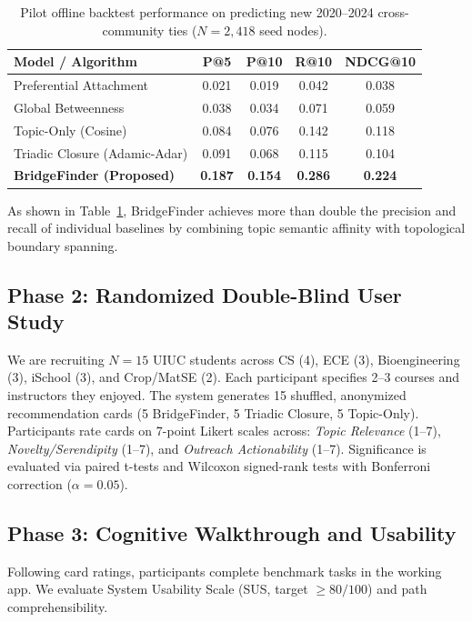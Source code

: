 \begin{table}[h]
\centering
\small
\caption{Pilot offline backtest performance on predicting new 2020--2024 cross-community ties ($N = 2,418$ seed nodes).}
\label{tab:backtest_pilot}
\begin{tabularx}{\columnwidth}{lcccc}
\toprule
\textbf{Model / Algorithm} & \textbf{P@5} & \textbf{P@10} & \textbf{R@10} & \textbf{NDCG@10} \\
\midrule
Preferential Attachment & 0.021 & 0.019 & 0.042 & 0.038 \\
Global Betweenness & 0.038 & 0.034 & 0.071 & 0.059 \\
Topic-Only (Cosine) & 0.084 & 0.076 & 0.142 & 0.118 \\
Triadic Closure (Adamic-Adar) & 0.091 & 0.068 & 0.115 & 0.104 \\
\midrule
\textbf{BridgeFinder (Proposed)} & \textbf{0.187} & \textbf{0.154} & \textbf{0.286} & \textbf{0.224} \\
\bottomrule
\end{tabularx}
\vspace{-3pt}
\end{table}

As shown in Table~\ref{tab:backtest_pilot}, BridgeFinder achieves more than double the precision and recall of individual baselines by combining topic semantic affinity with topological boundary spanning.

\subsection{Phase 2: Randomized Double-Blind User Study}
We are recruiting $N = 15$ UIUC students across CS (4), ECE (3), Bioengineering (3), iSchool (3), and Crop/MatSE (2). Each participant specifies 2--3 courses and instructors they enjoyed. The system generates 15 shuffled, anonymized recommendation cards (5 BridgeFinder, 5 Triadic Closure, 5 Topic-Only). Participants rate cards on 7-point Likert scales across: \emph{Topic Relevance} (1--7), \emph{Novelty/Serendipity} (1--7), and \emph{Outreach Actionability} (1--7). Significance is evaluated via paired t-tests and Wilcoxon signed-rank tests with Bonferroni correction ($\alpha = 0.05$).

\subsection{Phase 3: Cognitive Walkthrough and Usability}
Following card ratings, participants complete benchmark tasks in the working app. We evaluate System Usability Scale (SUS, target $\ge 80/100$) and path comprehensibility.

